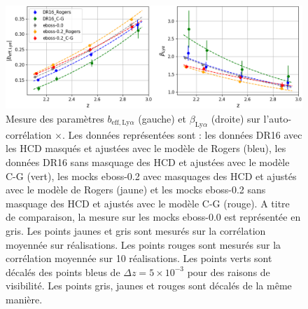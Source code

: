 \begin{figure}
  \centering
  \includegraphics[scale=0.45]{bias_CG_no_mask}
  \caption{Mesure des paramètres $b_{\mathrm{eff},\mathrm{Ly}\alpha}$ (gauche) et  $\beta_{\mathrm{Ly}\alpha}$ (droite) sur l'auto-corrélation \lya$\times$\lya{}.
    Les données représentées sont : les données DR16 avec les HCD masqués et ajustées avec le modèle de Rogers (bleu), les données DR16 sans masquage des HCD et ajustées avec le modèle C-G (vert), les mocks eboss-0.2 avec masquages des HCD et ajustés avec le modèle de Rogers (jaune) et les mocks eboss-0.2 sans masquage des HCD et ajustés avec le modèle C-G (rouge). A titre de comparaison, la mesure sur les mocks eboss-0.0 est représentée en gris.
    Les points jaunes et gris sont mesurés sur la corrélation moyennée sur \Nmocks{} réalisations. Les points rouges sont mesurés sur la corrélation moyennée sur \num{10} réalisations.
    Les points verts sont décalés des points bleus de $\Delta z = 5\times10^{-3}$ pour des raisons de visibilité. Les points gris, jaunes et rouges sont décalés de la même manière.
  }
  \label{fig:bias_CG_no_mask}
\end{figure}

